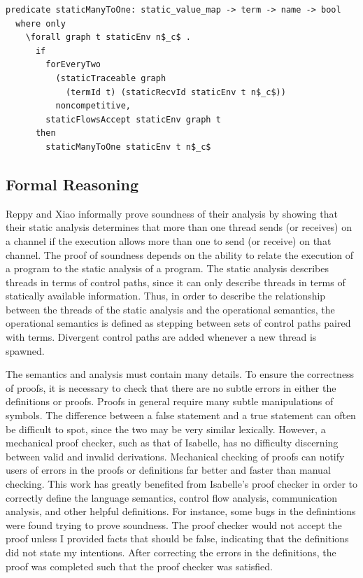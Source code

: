 \documentclass[letterpaper, 11pt]{extarticle}
\begin{document}
\begin{lstlisting}[language=logic, mathescape]
  predicate staticManyToOne: static_value_map -> term -> name -> bool
  where only
    \forall graph t staticEnv n$_c$ .
      if
        forEveryTwo
          (staticTraceable graph
            (termId t) (staticRecvId staticEnv t n$_c$))
          noncompetitive,
        staticFlowsAccept staticEnv graph t 
      then
        staticManyToOne staticEnv t n$_c$
\end{lstlisting}

\subsection{Formal Reasoning}

Reppy and Xiao informally prove soundness of their analysis by showing that their static analysis
determines that more than one thread sends (or receives) on a channel if the execution allows more
than one to send (or receive) on that channel. The proof of soundness depends on the
ability to relate the execution of a program to the static analysis of a program. The static
analysis describes threads in terms of control paths, since it can only describe threads in
terms of statically available information. Thus, in order to describe the relationship between
the threads of the static analysis and the operational semantics, the operational semantics is
defined as stepping between sets of control paths paired with terms. Divergent control paths
are added whenever a new thread is spawned.

The semantics and analysis must contain many details. To ensure the
correctness of proofs, it is necessary to check that there are no subtle errors in either the 
definitions or proofs. Proofs in general require many subtle manipulations of symbols. The
difference between a false statement and a true statement can often be difficult to spot, since
the two may be very similar lexically. However, a mechanical proof checker, such as that of 
Isabelle, has no difficulty discerning between valid and invalid derivations.
Mechanical checking of proofs can notify users of errors in the proofs or definitions far better
and faster than manual checking. This work has greatly benefited from Isabelle's proof checker in
order to correctly define the language semantics, control flow analysis, communication analysis,
and other helpful definitions. For instance, some bugs in the
definintions were found trying to prove
soundness. The proof checker would not accept the proof unless I provided facts that
should be false, indicating that the definitions did not state my intentions.
After correcting the errors in the definitions, the proof was completed such that the proof
checker was satisfied.
\end{document}
